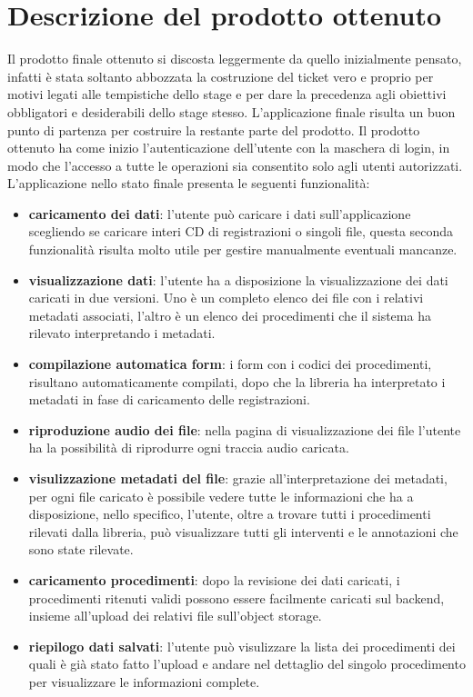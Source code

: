 \section{Descrizione del prodotto ottenuto}
Il prodotto finale ottenuto si discosta leggermente da quello inizialmente pensato, infatti è stata soltanto abbozzata la costruzione del ticket vero e proprio per motivi legati alle
tempistiche dello stage e per dare la precedenza agli obiettivi obbligatori e desiderabili dello stage stesso.
L'applicazione finale risulta un buon punto di partenza per costruire la restante parte del prodotto. Il prodotto ottenuto ha come inizio l'autenticazione dell'utente con
la maschera di login, in modo che l'accesso a tutte le operazioni sia consentito solo agli utenti autorizzati. L'applicazione nello stato finale presenta le seguenti funzionalità:
\begin{itemize}
  \item \textbf{caricamento dei dati}: l'utente può caricare i dati sull'applicazione scegliendo se caricare interi CD di registrazioni o singoli file, questa seconda funzionalità
        risulta molto utile per gestire manualmente eventuali mancanze.
  \item \textbf{visualizzazione dati}: l'utente ha a disposizione la visualizzazione dei dati caricati in due versioni. Uno è un completo elenco dei file con i relativi metadati associati,
        l'altro è un elenco dei procedimenti che il sistema ha rilevato interpretando i metadati.
  \item \textbf{compilazione automatica \gls{form}\glsfirstoccur}: i form con i codici dei procedimenti, risultano automaticamente compilati, dopo che la libreria ha interpretato i metadati in fase di caricamento delle registrazioni.
  \item \textbf{riproduzione audio dei file}: nella pagina di visualizzazione dei file l'utente ha la possibilità di riprodurre ogni traccia audio caricata.
  \item \textbf{visulizzazione metadati del file}: grazie all'interpretazione dei metadati, per ogni file caricato è possibile vedere tutte le informazioni che ha a disposizione,
        nello specifico, l'utente, oltre a trovare tutti i procedimenti rilevati dalla libreria, può visualizzare tutti gli interventi e le annotazioni che sono state rilevate.
  \item \textbf{caricamento procedimenti}: dopo la revisione dei dati caricati, i procedimenti ritenuti validi possono essere facilmente caricati sul backend, insieme all'upload dei relativi file sull'object storage.
  \item \textbf{riepilogo dati salvati}: l'utente può visulizzare la lista dei procedimenti dei quali è già stato fatto l'upload e andare nel dettaglio del singolo procedimento per visualizzare le informazioni complete.
\end{itemize}


